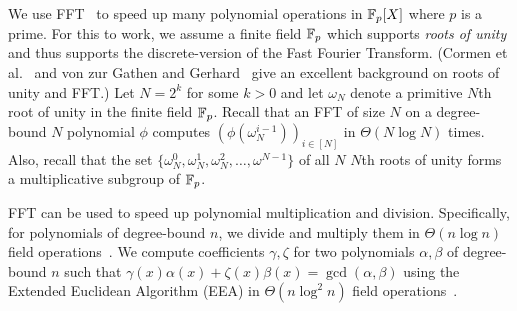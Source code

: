 We use FFT~\cite{vG13ModernCh8} to speed up many polynomial operations in $\mathbb{F}_p[X]$ where $p$ is a prime.
For this to work, we assume a finite field $\mathbb{F}_p$ which supports \textit{roots of unity} and thus supports the discrete-version of the Fast Fourier Transform.
(Cormen et al.~\cite{CLRS09} and von zur Gathen and Gerhard~\cite{vG13ModernCh8} give an excellent background on roots of unity and FFT.)
Let $N=2^k$ for some $k>0$ and let $\omega_N$ denote a primitive $N$th root of unity in the finite field $\mathbb{F}_p$.
Recall that an FFT of size $N$ on a degree-bound $N$ polynomial $\phi$ computes $(\phi(\omega_N^{i-1}))_{i\in[N]}$ in $\Theta(N\log{N})$ times.
Also, recall that the set $\{\omega_N^0, \omega_N^1,\omega_N^2,\dots,\omega^{N-1}\}$ of all $N$ $N$th roots of unity forms a multiplicative subgroup of $\mathbb{F}_p$.

FFT can be used to speed up polynomial multiplication and division.
Specifically, for polynomials of degree-bound $n$, we divide and multiply them in $\Theta(n\log{n})$ field operations~\cite{PS77,AH74}.
We compute \bezout coefficients $\gamma,\zeta$ for two polynomials $\alpha,\beta$ of degree-bound $n$ such that $\gamma(x)\alpha(x)+\zeta(x)\beta(x)=\gcd(\alpha,\beta)$ using the Extended Euclidean Algorithm (EEA) in $\Theta(n\log^2{n})$ field operations~\cite{vG13ModernCh11}.